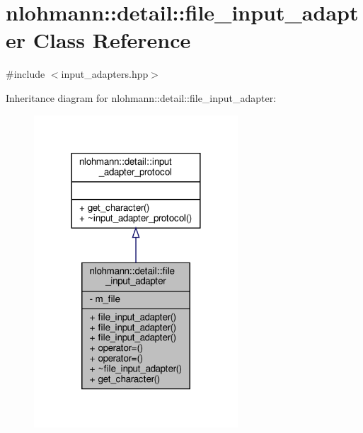 \hypertarget{classnlohmann_1_1detail_1_1file__input__adapter}{}\section{nlohmann\+:\+:detail\+:\+:file\+\_\+input\+\_\+adapter Class Reference}
\label{classnlohmann_1_1detail_1_1file__input__adapter}


{\ttfamily \#include $<$input\+\_\+adapters.\+hpp$>$}



Inheritance diagram for nlohmann\+:\+:detail\+:\+:file\+\_\+input\+\_\+adapter\+:\nopagebreak
\begin{figure}[H]
\begin{center}
\leavevmode
\includegraphics[width=216pt]{classnlohmann_1_1detail_1_1file__input__adapter__inherit__graph}
\end{center}
\end{figure}


